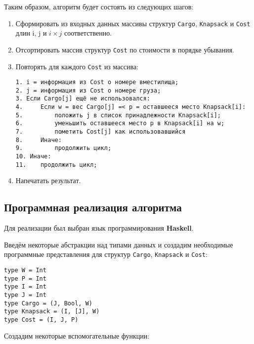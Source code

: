 \documentclass[14pt,a4paper]{extarticle}
\begin{document}
	Таким образом, алгоритм будет состоять из следующих шагов:
	\begin{enumerate}
		\item Сформировать из входных данных массивы структур \texttt{Cargo}, \texttt{Knapsack} и \texttt{Cost} длин i, j и $i \times j$ соответственно.
		\item Отсортировать массив структур \texttt{Cost} по стоимости в порядке убывания.
		\item Повторять для каждого \texttt{Cost} из массива: 
		\begin{verbatim}
1. i = информация из Cost о номере вместилища;
2. j = информация из Cost о номере груза;
3. Если Cargo[j] ещё не использовался:
4.     Если w = вес Cargo[j] =< p = оставшееся место Knapsack[i]:
5.         положить j в список принадлежности Knapsack[i];
6.         уменьшить оставшееся место p в Knapsack[i] на w;
7.         пометить Cost[j] как использовавшийся
8.	   Иначе:
9.         продолжить цикл;
10. Иначе:
11.    продолжить цикл;
		\end{verbatim}
		
		\item Напечатать результат.
		
	\end{enumerate}

\subsection{Программная реализация алгоритма}

	Для реализации был выбран язык программирования \textbf{Haskell}.
	
	Введём некоторые абстракции над типами данных и создадим необходимые программные представления для структур \texttt{Cargo}, \texttt{Knapsack} и \texttt{Cost}:
	\lstset{language=haskell}
	\begin{lstlisting}
type W = Int
type P = Int
type I = Int
type J = Int
type Cargo = (J, Bool, W)
type Knapsack = (I, [J], W)
type Cost = (I, J, P)
	\end{lstlisting}
	
	Создадим некоторые вспомогательные функции:
	
\end{document}
